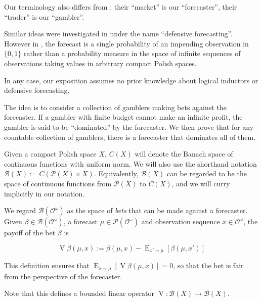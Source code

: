 \documentclass[aop,preprint]{imsart}
\numberwithin{equation}{section}
\theoremstyle{definition}
\theoremstyle{plain}
\DeclareMathOperator{\E}{E}
\newcommand{\PM}{\mathcal{P}}
\newcommand{\Ob}{\mathcal{O}}
\newcommand{\OO}{\Ob^\omega}
\newcommand{\PMO}{\PM(\OO)}
\newcommand{\Gm}{\mathcal{B}}
\newcommand{\GMO}{\Gm(\OO)}
\DeclareMathOperator{\V}{V}
\begin{document}
Our terminology also differs from \cite{Garrabrant_2016}: their \enquote{market} is our \enquote{forecaster}, their \enquote{trader} is our \enquote{gambler}.

Similar ideas were investigated in \cite{Vovk_2005} under the name \enquote{defensive forecasting}. However in \cite{Vovk_2005}, the forecast is a single probability of an impending observation in $\{0,1\}$ rather than a probability measure in the space of infinite sequences of observations taking values in arbitrary compact Polish spaces.

In any case, our exposition assumes no prior knowledge about logical inductors or defensive forecasting.

The idea is to consider a collection of gamblers making bets against the forecaster. If a gambler with finite budget cannot make an infinite profit, the gambler is said to be \enquote{dominated} by the forecaster. We then prove that for any countable collection of gamblers, there is a forecaster that dominates all of them.

Given a compact Polish space $X$, $C\left(X\right)$ will denote the Banach space of continuous functions with uniform norm. We will also use the shorthand notation $\Gm\left(X\right):=C\left(\PM\left(X\right) \times X\right)$. Equivalently, $\Gm\left(X\right)$ can be regarded to be the space of continuous functions from $\PM\left(X\right)$ to $C\left(X\right)$, and we will curry implicitly in our notation.

We regard $\GMO$ as the space of \emph{bets} that can be made against a forecaster. Given $\beta \in \GMO$, a forecast $\mu \in \PMO$ and observation sequence $x \in \OO$, the payoff of the bet $\beta$ is

\begin{equation}
\V{\beta}\left(\mu,x\right):=\beta\left(\mu,x\right) - \E_{x' \sim \mu}\left[\beta\left(\mu,x'\right)\right]
\end{equation}

This definition ensures that $\E_{x\sim\mu}\left[\V{\beta}(\mu,x)\right] = 0$, so that the bet is fair from the perspective of the forecaster.

Note that this defines a bounded linear operator $\V: \Gm\left(X\right) \rightarrow \Gm\left(X\right)$.
\end{document}
